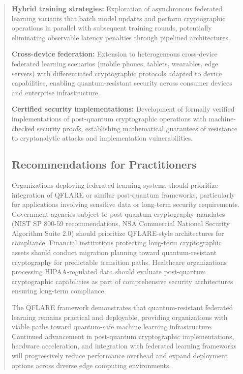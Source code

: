 \documentclass{svproc}
\begin{document}
\begin{abstract}
\textbf{Hybrid training strategies:} Exploration of asynchronous federated learning variants that batch model updates and perform cryptographic operations in parallel with subsequent training rounds, potentially eliminating observable latency penalties through pipelined architectures.

\textbf{Cross-device federation:} Extension to heterogeneous cross-device federated learning scenarios (mobile phones, tablets, wearables, edge servers) with differentiated cryptographic protocols adapted to device capabilities, enabling quantum-resistant security across consumer devices and enterprise infrastructure.

\textbf{Certified security implementations:} Development of formally verified implementations of post-quantum cryptographic operations with machine-checked security proofs, establishing mathematical guarantees of resistance to cryptanalytic attacks and implementation vulnerabilities.

\subsection{Recommendations for Practitioners}

Organizations deploying federated learning systems should prioritize integration of QFLARE or similar post-quantum frameworks, particularly for applications involving sensitive data or long-term security requirements. Government agencies subject to post-quantum cryptography mandates (NIST SP 800-59 recommendations, NSA Commercial National Security Algorithm Suite 2.0) should prioritize QFLARE-style architectures for compliance. Financial institutions protecting long-term cryptographic assets should conduct migration planning toward quantum-resistant cryptography for predictable transition paths. Healthcare organizations processing HIPAA-regulated data should evaluate post-quantum cryptographic capabilities as part of comprehensive security architectures ensuring long-term compliance.

The QFLARE framework demonstrates that quantum-resistant federated learning remains practical and deployable, providing organizations with viable paths toward quantum-safe machine learning infrastructure. Continued advancement in post-quantum cryptographic implementations, hardware acceleration, and integration with federated learning frameworks will progressively reduce performance overhead and expand deployment options across diverse edge computing environments.


\end{abstract}
\end{document}
